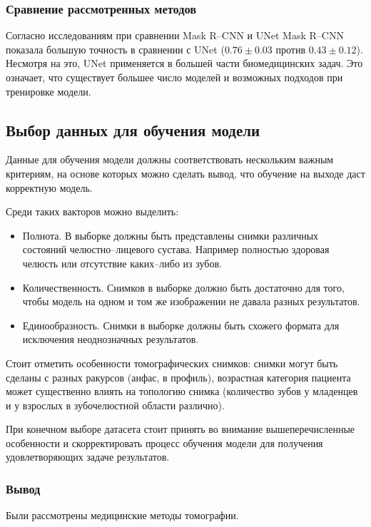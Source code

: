 \subsubsection{Сравнение рассмотренных методов}

Согласно исследованиям \cite{segcomp} при сравнении Mask R--CNN и UNet Mask R--CNN показала большую точность в сравнении с UNet ($0.76 \pm 0.03$ против $0.43 \pm 0.12$). Несмотря на это, UNet применяется в большей части биомедицинских задач. Это означает, что существует большее число моделей и возможных подходов при тренировке модели.

\subsection{Выбор данных для обучения модели}

Данные для обучения модели должны соответствовать нескольким важным критериям, на основе которых можно сделать вывод, что обучение на выходе даст корректную модель.

Среди таких вакторов можно выделить:
\begin{itemize}
	\item Полнота. В выборке должны быть представлены снимки различных состояний челюстно--лицевого сустава. Например полностью здоровая челюсть или отсутствие каких--либо из зубов.
	\item Количественность. Снимков в выборке должно быть достаточно для того, чтобы модель на одном и том же изображении не давала разных результатов.
	\item Единообразность. Снимки в выборке должны быть схожего формата для исключения неоднозначных результатов.
\end{itemize}

Стоит отметить особенности томографических снимков: снимки могут быть сделаны с разных ракурсов (анфас, в профиль), возрастная категория пациента может существенно влиять на топологию снимка (количество зубов у младенцев и у взрослых в зубочелюстной области различно).

При конечном выборе датасета стоит принять во внимание вышеперечисленные особенности и скорректировать процесс обучения модели для получения удовлетворяющих задаче результатов.

\subsubsection*{Вывод}

Были рассмотрены медицинские методы томографии.

